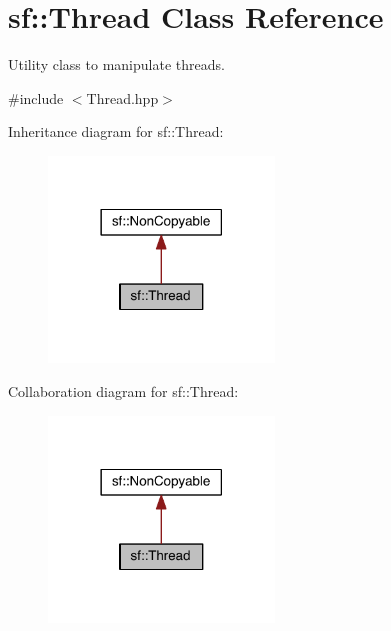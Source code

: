 \hypertarget{classsf_1_1_thread}{\section{sf\-:\-:Thread Class Reference}
\label{classsf_1_1_thread}
}


Utility class to manipulate threads.  




{\ttfamily \#include $<$Thread.\-hpp$>$}



Inheritance diagram for sf\-:\-:Thread\-:
\nopagebreak
\begin{figure}[H]
\begin{center}
\leavevmode
\includegraphics[width=170pt]{classsf_1_1_thread__inherit__graph}
\end{center}
\end{figure}


Collaboration diagram for sf\-:\-:Thread\-:
\nopagebreak
\begin{figure}[H]
\begin{center}
\leavevmode
\includegraphics[width=170pt]{classsf_1_1_thread__coll__graph}
\end{center}
\end{figure}

